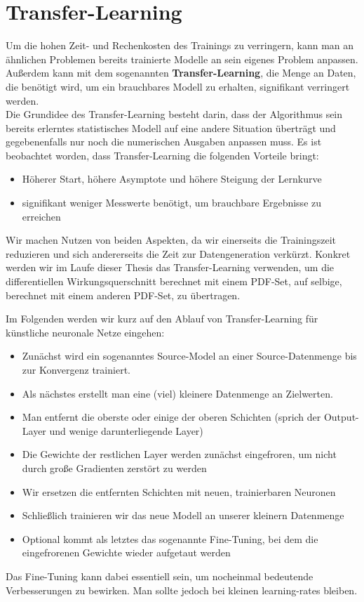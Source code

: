 \section{Transfer-Learning}
Um die hohen Zeit- und Rechenkosten des Trainings zu verringern, kann man an ähnlichen Problemen bereits trainierte Modelle an sein eigenes Problem anpassen. Außerdem kann mit dem sogenannten \textbf{Transfer-Learning}, die Menge an Daten, die benötigt wird, um ein brauchbares Modell zu erhalten, signifikant verringert werden. \\
Die Grundidee des Transfer-Learning besteht darin, dass der Algorithmus sein bereits erlerntes statistisches Modell auf eine andere Situation überträgt und gegebenenfalls nur noch die numerischen Ausgaben anpassen muss. Es ist beobachtet worden, dass Transfer-Learning die folgenden Vorteile bringt:
\begin{itemize}
	\setlength\itemsep{0.1cm}
	\setlength{\parskip}{0.1cm}
	\item Höherer Start, höhere Asymptote und höhere Steigung der Lernkurve
	\item signifikant weniger Messwerte benötigt, um brauchbare Ergebnisse zu erreichen
\end{itemize}
Wir machen Nutzen von beiden Aspekten, da wir einerseits die Trainingszeit reduzieren und sich andererseits die Zeit zur Datengeneration verkürzt. Konkret werden wir im Laufe dieser Thesis das Transfer-Learning verwenden, um die differentiellen Wirkungsquerschnitt berechnet mit einem PDF-Set, auf selbige, berechnet mit einem anderen PDF-Set, zu übertragen.

Im Folgenden werden wir kurz auf den Ablauf von Transfer-Learning für künstliche neuronale Netze eingehen:
\begin{itemize}
	\setlength\itemsep{0.1cm}
	\setlength{\parskip}{0.1cm}
	\item Zunächst wird ein sogenanntes Source-Model an einer Source-Datenmenge bis zur Konvergenz trainiert. 
	\item Als nächstes erstellt man eine (viel) kleinere Datenmenge an Zielwerten.
	\item Man entfernt die oberste oder einige der oberen Schichten (sprich der Output-Layer und wenige darunterliegende Layer)
	\item Die Gewichte der restlichen Layer werden zunächst eingefroren, um nicht durch große Gradienten zerstört zu werden
	\item Wir ersetzen die entfernten Schichten mit neuen, trainierbaren Neuronen
	\item Schließlich trainieren wir das neue Modell an unserer kleinern Datenmenge
	\item Optional kommt als letztes das sogenannte Fine-Tuning, bei dem die eingefrorenen Gewichte wieder aufgetaut werden
\end{itemize}
Das Fine-Tuning kann dabei essentiell sein, um nocheinmal bedeutende Verbesserungen zu bewirken. Man sollte jedoch bei kleinen learning-rates bleiben. 


